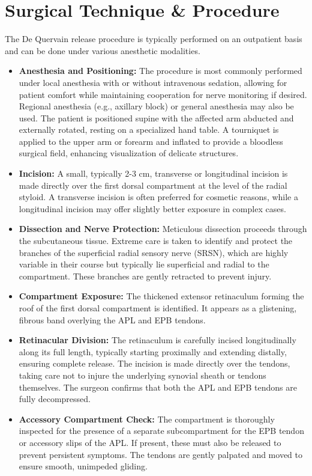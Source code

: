 \section*{Surgical Technique \& Procedure}
The De Quervain release procedure is typically performed on an outpatient basis and can be done under various anesthetic modalities.

\begin{itemize}
  \item \textbf{Anesthesia and Positioning:} The procedure is most commonly performed under local anesthesia with or without intravenous sedation, allowing for patient comfort while maintaining cooperation for nerve monitoring if desired. Regional anesthesia (e.g., axillary block) or general anesthesia may also be used. The patient is positioned supine with the affected arm abducted and externally rotated, resting on a specialized hand table. A tourniquet is applied to the upper arm or forearm and inflated to provide a bloodless surgical field, enhancing visualization of delicate structures.
  \item \textbf{Incision:} A small, typically 2-3 cm, transverse or longitudinal incision is made directly over the first dorsal compartment at the level of the radial styloid. A transverse incision is often preferred for cosmetic reasons, while a longitudinal incision may offer slightly better exposure in complex cases.
  \item \textbf{Dissection and Nerve Protection:} Meticulous dissection proceeds through the subcutaneous tissue. Extreme care is taken to identify and protect the branches of the superficial radial sensory nerve (SRSN), which are highly variable in their course but typically lie superficial and radial to the compartment. These branches are gently retracted to prevent injury.
  \item \textbf{Compartment Exposure:} The thickened extensor retinaculum forming the roof of the first dorsal compartment is identified. It appears as a glistening, fibrous band overlying the APL and EPB tendons.
  \item \textbf{Retinacular Division:} The retinaculum is carefully incised longitudinally along its full length, typically starting proximally and extending distally, ensuring complete release. The incision is made directly over the tendons, taking care not to injure the underlying synovial sheath or tendons themselves. The surgeon confirms that both the APL and EPB tendons are fully decompressed.
  \item \textbf{Accessory Compartment Check:} The compartment is thoroughly inspected for the presence of a separate subcompartment for the EPB tendon or accessory slips of the APL. If present, these must also be released to prevent persistent symptoms. The tendons are gently palpated and moved to ensure smooth, unimpeded gliding.

\end{itemize}
